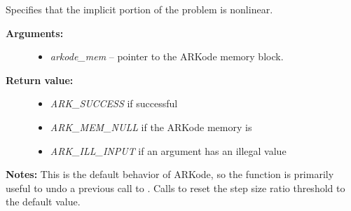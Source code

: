 \documentclass[letterpaper,10pt,english]{sphinxmanual}
\begin{document}
\begin{fulllineitems}
\label{c_interface/User_callable:c.ARKodeSetNonlinear}
Specifies that the implicit portion of the problem is nonlinear.
\begin{description}
\item[{\textbf{Arguments:}}] \leavevmode\begin{itemize}
\item {} 
\emph{arkode\_mem} -- pointer to the ARKode memory block.

\end{itemize}

\item[{\textbf{Return value:}}] \leavevmode\begin{itemize}
\item {} 
\emph{ARK\_SUCCESS} if successful

\item {} 
\emph{ARK\_MEM\_NULL} if the ARKode memory is 

\item {} 
\emph{ARK\_ILL\_INPUT} if an argument has an illegal value

\end{itemize}

\end{description}

\textbf{Notes:} This is the default behavior of ARKode, so the function
is primarily useful to undo a previous call to
{\hyperref[c_interface/User_callable:c.ARKodeSetLinear]{\emph{}}}.  Calls
{\hyperref[c_interface/User_callable:c.ARKodeSetDeltaGammaMax]{\emph{}}} to reset the step size ratio
threshold to the default value.

\end{fulllineitems}

\end{document}

